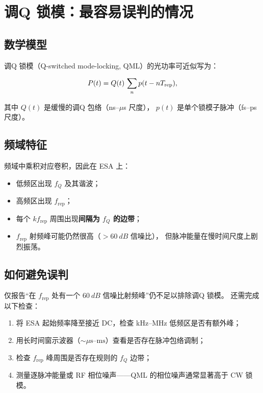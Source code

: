 \documentclass[11pt,a4paper]{article}
\newcommand{\rep}{f_{\text{rep}}}
\begin{document}
\section{调Q 锁模：最容易误判的情况}

\subsection{数学模型}

调Q 锁模（Q-switched mode-locking, QML）的光功率可近似写为：

\begin{equation}\label{eq:qml_power}
P(t) = Q(t)\,\sum_n p(t - nT_{\rm rep}),
\end{equation}

其中 $Q(t)$ 是缓慢的调Q 包络（ns--$\mu$s 尺度），
$p(t)$ 是单个锁模子脉冲（fs--ps 尺度）。

\subsection{频域特征}

频域中乘积对应卷积，因此在 ESA 上：
\begin{itemize}
    \item 低频区出现 $f_Q$ 及其谐波；
    \item 高频区出现 $\rep$；
    \item 每个 $k\rep$ 周围出现\textbf{间隔为 $f_Q$ 的边带}；
    \item $\rep$ 射频峰可能仍然很高（$> \SI{60}{dB}$ 信噪比），
    但脉冲能量在慢时间尺度上剧烈振荡。
\end{itemize}

\subsection{如何避免误判}

仅报告“在 $\rep$ 处有一个 $\SI{60}{dB}$ 信噪比射频峰”仍不足以排除调Q 锁模。
还需完成以下检查：

\begin{enumerate}[label=(\arabic*)]
    \item 将 ESA 起始频率降至接近 DC，检查 kHz--MHz 低频区是否有额外峰；
    \item 用长时间窗示波器（$\sim\mu\text{s--ms}$）查看是否存在脉冲包络调制；
    \item 检查 $\rep$ 峰周围是否存在规则的 $f_Q$ 边带；
    \item 测量逐脉冲能量或 RF 相位噪声——QML 的相位噪声通常显著高于 CW 锁模。
\end{enumerate}
\end{document}
